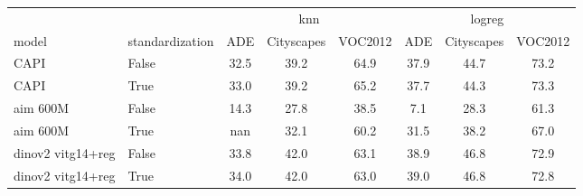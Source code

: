 \begin{table}
\begin{tabular}{llcccccc}
\toprule
 &  & \multicolumn{3}{c}{knn} & \multicolumn{3}{c}{logreg} \\
      \cmidrule{3-5} \cmidrule{6-8}
model & standardization & ADE & Cityscapes & VOC2012 & ADE & Cityscapes & VOC2012 \\
\midrule
CAPI & False & {\cellcolor[HTML]{0E8245}} \color[HTML]{F1F1F1} 32.5 & {\cellcolor[HTML]{3FAA59}} \color[HTML]{F1F1F1} 39.2 & {\cellcolor[HTML]{016A38}} \color[HTML]{F1F1F1} 64.9 & {\cellcolor[HTML]{097940}} \color[HTML]{F1F1F1} 37.9 & {\cellcolor[HTML]{249D53}} \color[HTML]{F1F1F1} 44.7 & {\cellcolor[HTML]{016A38}} \color[HTML]{F1F1F1} 73.2 \\
CAPI & True & {\cellcolor[HTML]{097940}} \color[HTML]{F1F1F1} 33.0 & {\cellcolor[HTML]{3FAA59}} \color[HTML]{F1F1F1} 39.2 & {\cellcolor[HTML]{006837}} \color[HTML]{F1F1F1} 65.2 & {\cellcolor[HTML]{0A7B41}} \color[HTML]{F1F1F1} 37.7 & {\cellcolor[HTML]{33A456}} \color[HTML]{F1F1F1} 44.3 & {\cellcolor[HTML]{006837}} \color[HTML]{F1F1F1} 73.3 \\
aim 600M & False & {\cellcolor[HTML]{F88C51}} \color[HTML]{F1F1F1} 14.3 & {\cellcolor[HTML]{F99355}} \color[HTML]{000000} 27.8 & {\cellcolor[HTML]{FEEDA1}} \color[HTML]{000000} 38.5 & {\cellcolor[HTML]{A50026}} \color[HTML]{F1F1F1} 7.1 & {\cellcolor[HTML]{A50026}} \color[HTML]{F1F1F1} 28.3 & {\cellcolor[HTML]{A50026}} \color[HTML]{F1F1F1} 61.3 \\
aim 600M & True & {\cellcolor[HTML]{000000}} \color[HTML]{F1F1F1} nan & {\cellcolor[HTML]{FFFAB6}} \color[HTML]{000000} 32.1 & {\cellcolor[HTML]{1B9950}} \color[HTML]{F1F1F1} 60.2 & {\cellcolor[HTML]{7DC765}} \color[HTML]{000000} 31.5 & {\cellcolor[HTML]{F2FAAE}} \color[HTML]{000000} 38.2 & {\cellcolor[HTML]{FFF8B4}} \color[HTML]{000000} 67.0 \\
dinov2 vitg14+reg & False & {\cellcolor[HTML]{016A38}} \color[HTML]{F1F1F1} 33.8 & {\cellcolor[HTML]{006837}} \color[HTML]{F1F1F1} 42.0 & {\cellcolor[HTML]{0B7D42}} \color[HTML]{F1F1F1} 63.1 & {\cellcolor[HTML]{006837}} \color[HTML]{F1F1F1} 38.9 & {\cellcolor[HTML]{006837}} \color[HTML]{F1F1F1} 46.8 & {\cellcolor[HTML]{08773F}} \color[HTML]{F1F1F1} 72.9 \\
dinov2 vitg14+reg & True & {\cellcolor[HTML]{006837}} \color[HTML]{F1F1F1} 34.0 & {\cellcolor[HTML]{006837}} \color[HTML]{F1F1F1} 42.0 & {\cellcolor[HTML]{0B7D42}} \color[HTML]{F1F1F1} 63.0 & {\cellcolor[HTML]{006837}} \color[HTML]{F1F1F1} 39.0 & {\cellcolor[HTML]{006837}} \color[HTML]{F1F1F1} 46.8 & {\cellcolor[HTML]{097940}} \color[HTML]{F1F1F1} 72.8 \\

\end{tabular}
\end{table}

